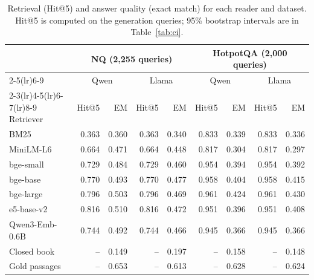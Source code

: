 \begin{table}[t]
\centering
\small
\caption{Retrieval (Hit@5) and answer quality (exact match) for each reader and dataset. Hit@5 is computed on the generation queries; 95\% bootstrap intervals are in Table~\ref{tab:ci}.}
\label{tab:main}
\begin{tabular}{lrrrrrrrr}
\toprule
 & \multicolumn{4}{c}{NQ (2,255 queries)} & \multicolumn{4}{c}{HotpotQA (2,000 queries)} \\ \cmidrule(lr){2-5}\cmidrule(lr){6-9} & \multicolumn{2}{c}{Qwen} & \multicolumn{2}{c}{Llama} & \multicolumn{2}{c}{Qwen} & \multicolumn{2}{c}{Llama} \\ \cmidrule(lr){2-3}\cmidrule(lr){4-5}\cmidrule(lr){6-7}\cmidrule(lr){8-9}
Retriever & Hit@5 & EM & Hit@5 & EM & Hit@5 & EM & Hit@5 & EM \\
\midrule
BM25 & 0.363 & 0.360 & 0.363 & 0.340 & 0.833 & 0.339 & 0.833 & 0.336 \\
MiniLM-L6 & 0.664 & 0.471 & 0.664 & 0.448 & 0.817 & 0.304 & 0.817 & 0.297 \\
bge-small & 0.729 & 0.484 & 0.729 & 0.460 & 0.954 & 0.394 & 0.954 & 0.392 \\
bge-base & 0.770 & 0.493 & 0.770 & 0.477 & 0.958 & 0.404 & 0.958 & 0.415 \\
bge-large & 0.796 & 0.503 & 0.796 & 0.469 & 0.961 & 0.424 & 0.961 & 0.430 \\
e5-base-v2 & 0.816 & 0.510 & 0.816 & 0.472 & 0.951 & 0.396 & 0.951 & 0.408 \\
Qwen3-Emb-0.6B & 0.744 & 0.492 & 0.744 & 0.466 & 0.945 & 0.366 & 0.945 & 0.366 \\
Closed book & -- & 0.149 & -- & 0.197 & -- & 0.158 & -- & 0.148 \\
Gold passages & -- & 0.653 & -- & 0.613 & -- & 0.628 & -- & 0.624 \\
\bottomrule
\end{tabular}
\end{table}
